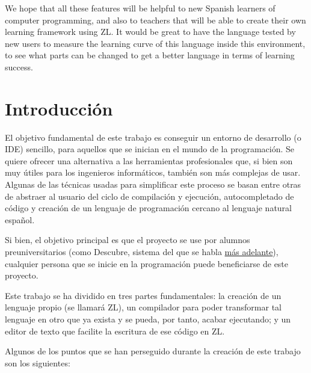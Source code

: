 \documentclass{report}
\begin{document}
	We hope that all these features will be helpful to new Spanish learners of computer programming, and also to teachers that will be able to create their own learning framework using ZL. It would be great to have the language tested by new users to measure the learning curve of this language inside this environment, to see what parts can be changed to get a better language in terms of learning success. 
	
	\chapter{Introducción}
	
	El objetivo fundamental de este trabajo es conseguir un entorno de desarrollo (o IDE) sencillo, para aquellos que se inician en el mundo de la programación. Se quiere ofrecer una alternativa a las herramientas profesionales que, si bien son muy útiles para los ingenieros informáticos, también son más complejas de usar. Algunas de las técnicas usadas para simplificar este proceso se basan entre otras de abstraer al usuario del ciclo de compilación y ejecución, autocompletado de código y creación de un lenguaje de programación cercano al lenguaje natural español. 
	
	\vspace{10px}
	
	Si bien, el objetivo principal es que el proyecto se use por alumnos preuniversitarios (como Descubre, sistema del que se habla \hyperref[descubre]{más adelante}), cualquier persona que se inicie en la programación puede beneficiarse de este proyecto.
	
	\vspace{10px}
	
	Este trabajo se ha dividido en tres partes fundamentales: la creación de un lenguaje propio (se llamará ZL), un compilador para poder transformar tal lenguaje en otro que ya exista y se pueda, por tanto, acabar ejecutando; y un editor de texto que facilite la escritura de ese código en ZL.

	\vspace{10px}

	Algunos de los puntos que se han perseguido durante la creación de este trabajo son los siguientes:
	
\end{document}
